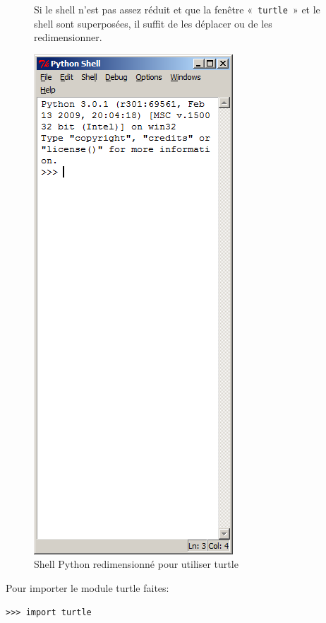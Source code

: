 \begin{figure}[ht]
\begin{minipage}{0.4\linewidth}
Si le shell n'est pas assez réduit et que la fenêtre «~\texttt{turtle}~» et le shell sont superposées, il suffit de les déplacer ou de les redimensionner.
\end{minipage}
\hspace{0.5cm}
\begin{minipage}{0.5\linewidth}
\centering
\includegraphics[scale=0.5]{images/shell_pour_turtle.png}
\caption{Shell Python redimensionné pour utiliser turtle}
\label{fig:shellami}
\end{minipage}
\end{figure}

Pour importer le module turtle faites:

\begin{Verbatim}[frame=single,rulecolor=\color{mbleu}, label=à taper]
>>> import turtle
\end{Verbatim}

